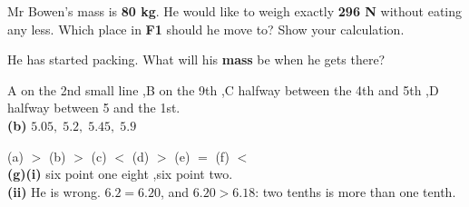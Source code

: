 \documentclass[12pt,a4paper]{article}
\newif\ifkey
\newif\iffr
\newcommand{\fr}[1]{\unskip\iffr\par\vspace{1pt}\noindent{\small\itshape\color{black!60}#1}\par\fi}
\begin{document}
\newlength{\fourbox}
\iffr\setlength{\fourbox}{6.0cm}\else\setlength{\fourbox}{4.0cm}\fi
\noindent\begin{minipage}{\textwidth}
Mr Bowen's mass is \textbf{80 kg}. He would like to weigh exactly \textbf{296 N}
without eating any less. Which place in \textbf{F1} should he move to? Show your
calculation.
\fr{Mr Bowen a une masse de 80 kg. Il voudrait peser exactement 296 N, sans manger
moins. Sur quel astre de F1 doit-il d\'em\'enager~? Montre ton calcul.}

\begin{workspace}[\fourbox]\end{workspace}

\noindent He has started packing. What will his \textbf{mass} be when he gets there?
\hfill \blank[3.0cm]
\fr{Il a commenc\'e \`a faire ses valises. Quelle sera sa masse (\eng{mass})
l\`a-bas~?}
\end{minipage}

\ifkey
\clearpage


\linespread{1.0}\selectfont
{}

\noindent A on the 2nd small line \sep B on the 9th \sep C halfway between the 4th
and 5th \sep D halfway between 5 and the 1st. \\
\textbf{(b)} $5.05, \; 5.2, \; 5.45, \; 5.9$

\smallskip
{}

\noindent (a) $>$ \quad (b) $>$ \quad (c) $<$ \quad (d) $>$ \quad (e) $=$ \quad
(f) $<$ \\
\textbf{(g)(i)} six point one eight \sep six point two. \\
\textbf{(ii)} He is wrong. $6.2 = 6.20$, and $6.20 > 6.18$: two tenths is more than
one tenth.
\end{document}
